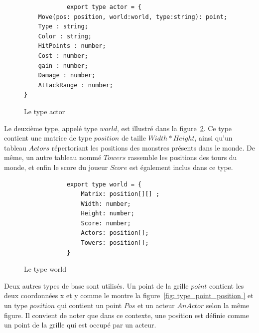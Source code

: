 \documentclass[11pt]{article}
\begin{document}
               \begin{figure}[h]
                \centering
            \begin{verbatim}
            export type actor = {
    Move(pos: position, world:world, type:string): point;
    Type : string;
    Color : string;
    HitPoints : number;
    Cost : number;
    gain : number;
    Damage : number;
    AttackRange : number;
}  \end{verbatim}
                \caption{Le type actor} 
                \label{fig: type_actor } 
            \end{figure}
            
            Le deuxième type, appelé type $world$, est illustré dans la figure~\ref{fig: type_world }. Ce type contient une matrice de type $position$ de taille $Width*Height$, ainsi qu'un tableau $Actors$ répertoriant les positions des monstres présents dans le monde. De même, un autre tableau nommé $Towers$ rassemble les positions des tours du monde, et enfin le score du joueur $Score$ est également inclus dans ce type.
            \begin{figure}[h]
            \centering
            \begin{verbatim}
            export type world = {
                Matrix: position[][] ;
                Width: number;
                Height: number;
                Score: number;
                Actors: position[];
                Towers: position[];
            }
            \end{verbatim}
            \caption{Le type world} 
            \label{fig: type_world } 
            \end{figure}
            Deux autres types de base sont utilisés. Un point de la grille $point$ contient les deux coordonnées x et y comme le montre la figure~\ref{fig: type_point_position } et un type $position$ qui contient un point $Pos$ et un acteur $AnActor$ selon la même figure. Il convient de noter que dans ce contexte, une position est définie comme un point de la grille qui est occupé par un acteur.
\end{document}
